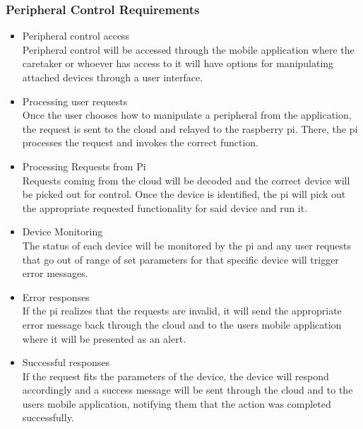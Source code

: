 \subsubsection{Peripheral Control Requirements}
        	\begin{itemize}
            	\item{Peripheral control access\\Peripheral control will be accessed through the mobile application where the caretaker or whoever has access to it will have options for manipulating attached devices through a user interface.}
                \item{Processing user requests\\Once the user chooses how to manipulate a peripheral from the application, the request is sent to the cloud and relayed to the raspberry pi. There, the pi processes the request and invokes the correct function.}
                \item{Processing Requests from Pi\\ Requests coming from the cloud will be decoded and the correct device will be picked out for control. Once the device is identified, the pi will pick out the appropriate requested functionality for said device and run it.}
                \item{Device Monitoring\\The status of each device will be monitored by the pi and any user requests that go out of range of set parameters for that specific device will trigger error messages.}
                \item{Error responses\\If the pi realizes that the requests are invalid, it will send the appropriate error message back through the cloud and to the users mobile application where it will be presented as an alert.}
                \item{Successful responses\\ If the request fits the parameters of the device, the device will respond accordingly and a success message will be sent through the cloud and to the users mobile application, notifying them that the action was completed successfully.}
            \end{itemize}
